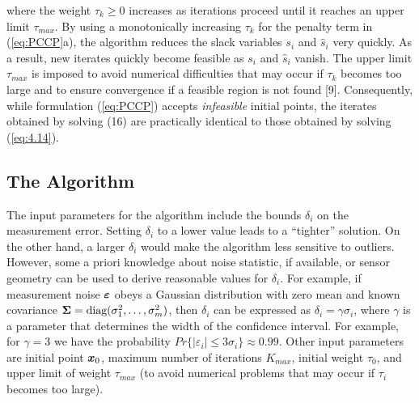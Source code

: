 \noindent
where the weight  $\tau_k \geq 0$ increases as iterations proceed until it reaches an upper limit $\tau_{max}$. By using a monotonically increasing  $\tau_k$ for the penalty term in (\ref{eq:PCCP}a), the algorithm reduces the slack variables $s_i$  and $\hat{s}_i$  very quickly. As a result, new iterates quickly become feasible as    $s_i$  and $\hat{s}_i$    vanish. The upper limit $\tau_{max}$  is imposed to avoid numerical difficulties that may occur if $\tau_k$  becomes too large and to ensure convergence if a feasible region is not found [9]. Consequently, while formulation (\ref{eq:PCCP}) accepts \textit{infeasible} initial points, the iterates obtained by solving (16) are practically identical to those obtained by solving (\ref{eq:4.14}).



\subsection{The Algorithm}
\phantom{m}

The input parameters for the algorithm include the bounds $\delta_i$ on the measurement error.  Setting $\delta_i$  to a lower value leads to a ``tighter'' solution. On the other hand, a larger $\delta_i$ would make the algorithm less sensitive to outliers.  However, some a priori knowledge about noise statistic, if available, or sensor geometry can be used 
to derive reasonable values for $\delta_i$. For example, if measurement noise $\mbox{\boldmath${\varepsilon}$}$ obeys a Gaussian distribution with zero mean and known covariance $\mbox{\boldmath${\Sigma}$} = \mbox{diag}(\sigma_1^2, \ldots, \sigma_m^2)$, then $\delta_i$ can be expressed as $\delta_i = \gamma \sigma_i$, where $\gamma$ is a parameter that determines the width of the confidence interval. For example, for $\gamma = 3$ we have the probability $Pr\{|\varepsilon_i| \leq 3\sigma_i\} \approx 0.99$. Other input parameters are initial point $\mbox{\boldmath$x$}_0$, maximum number of iterations $K_{max}$, initial weight $\tau_0$, and upper limit of weight $\tau_{max}$ (to avoid numerical problems that may occur  if $\tau_i$ becomes too large).

